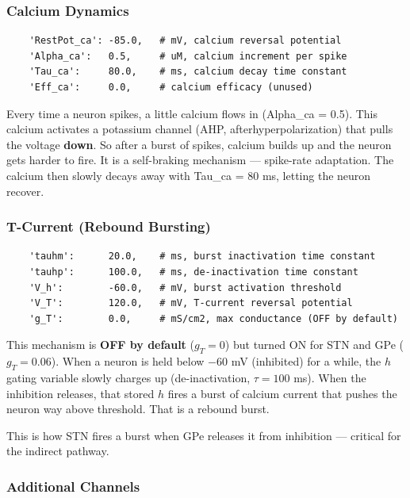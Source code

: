 \documentclass[11pt,a4paper]{article}
\begin{document}
\subsubsection{Calcium Dynamics}

\begin{lstlisting}
    'RestPot_ca': -85.0,   # mV, calcium reversal potential
    'Alpha_ca':   0.5,     # uM, calcium increment per spike
    'Tau_ca':     80.0,    # ms, calcium decay time constant
    'Eff_ca':     0.0,     # calcium efficacy (unused)
\end{lstlisting}

Every time a neuron spikes, a little calcium flows in (Alpha\_ca = 0.5). This calcium activates a potassium channel (AHP, afterhyperpolarization) that pulls the voltage \textbf{down}. So after a burst of spikes, calcium builds up and the neuron gets harder to fire. It is a self-braking mechanism --- spike-rate adaptation. The calcium then slowly decays away with Tau\_ca = 80 ms, letting the neuron recover.

\subsubsection{T-Current (Rebound Bursting)}

\begin{lstlisting}
    'tauhm':      20.0,    # ms, burst inactivation time constant
    'tauhp':      100.0,   # ms, de-inactivation time constant
    'V_h':        -60.0,   # mV, burst activation threshold
    'V_T':        120.0,   # mV, T-current reversal potential
    'g_T':        0.0,     # mS/cm2, max conductance (OFF by default)
\end{lstlisting}

This mechanism is \textbf{OFF by default} ($g_T = 0$) but turned ON for STN and GPe ($g_T = 0.06$). When a neuron is held below $-$60 mV (inhibited) for a while, the $h$ gating variable slowly charges up (de-inactivation, $\tau = 100$ ms). When the inhibition releases, that stored $h$ fires a burst of calcium current that pushes the neuron way above threshold. That is a rebound burst.

This is how STN fires a burst when GPe releases it from inhibition --- critical for the indirect pathway.

\subsubsection{Additional Channels}
\end{document}
